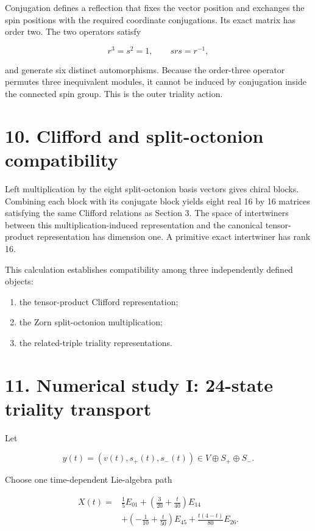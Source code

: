 \documentclass[11pt]{article}
\begin{document}
Conjugation defines a reflection that fixes the vector position and exchanges the spin positions with the required coordinate conjugations. Its exact matrix has order two. The two operators satisfy

\[
r^3=s^2=1,
\qquad srs=r^{-1},
\]

and generate six distinct automorphisms. Because the order-three operator permutes three inequivalent modules, it cannot be induced by conjugation inside the connected spin group. This is the outer triality action.

\section{10. Clifford and split-octonion compatibility}

Left multiplication by the eight split-octonion basis vectors gives chiral blocks. Combining each block with its conjugate block yields eight real 16 by 16 matrices satisfying the same Clifford relations as Section 3. The space of intertwiners between this multiplication-induced representation and the canonical tensor-product representation has dimension one. A primitive exact intertwiner has rank 16.

This calculation establishes compatibility among three independently defined objects:

\begin{enumerate}
\item the tensor-product Clifford representation;
\item the Zorn split-octonion multiplication;
\item the related-triple triality representations.
\end{enumerate}

\section{11. Numerical study I: 24-state triality transport}

Let

\[
y(t)=(v(t),s_+(t),s_-(t))\in V\oplus S_+\oplus S_-.
\]

Choose one time-dependent Lie-algebra path

\[
\begin{aligned}
X(t)=&\frac15E_{01}
+\left(\frac3{20}+\frac{t}{40}\right)E_{14}\\
&+\left(-\frac1{10}+\frac{t}{50}\right)E_{45}
+\frac{t(4-t)}{80}E_{26}.
\end{aligned}
\]
\end{document}
